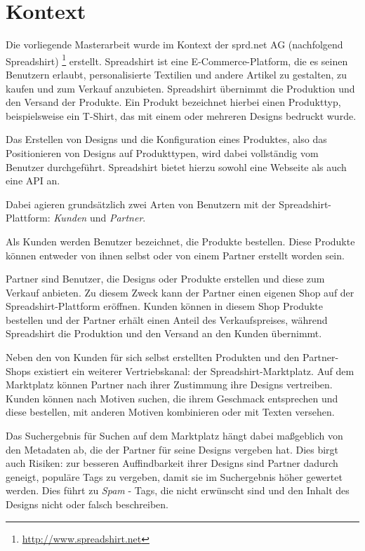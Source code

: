 \section{Kontext}

Die vorliegende Masterarbeit wurde im Kontext der sprd.net AG (nachfolgend Spreadshirt) \footnote{\url{http://www.spreadshirt.net}} erstellt. Spreadshirt ist eine E-Commerce-Platform, die es seinen Benutzern erlaubt, personalisierte Textilien und andere Artikel zu gestalten, zu kaufen und zum Verkauf anzubieten. Spreadshirt übernimmt die Produktion und den Versand der Produkte. Ein Produkt bezeichnet hierbei einen Produkttyp, beispielsweise ein T-Shirt, das mit einem oder mehreren Designs bedruckt wurde.

Das Erstellen von Designs und die Konfiguration eines Produktes, also das Positionieren von Designs auf Produkttypen, wird dabei vollständig vom Benutzer durchgeführt. Spreadshirt bietet hierzu sowohl eine Webseite als auch eine API an.

Dabei agieren grundsätzlich zwei Arten von Benutzern mit der Spreadshirt-Plattform: \emph{Kunden} und \emph{Partner}.

Als Kunden werden Benutzer bezeichnet, die Produkte bestellen. Diese Produkte können entweder von ihnen selbst oder von einem Partner erstellt worden sein. 

Partner sind Benutzer, die Designs oder Produkte erstellen und diese zum Verkauf anbieten. Zu diesem Zweck kann der Partner einen eigenen Shop auf der Spreadshirt-Plattform eröffnen. Kunden können in diesem Shop Produkte bestellen und der Partner erhält einen Anteil des Verkaufspreises, während Spreadshirt die Produktion und den Versand an den Kunden übernimmt.

Neben den von Kunden für sich selbst erstellten Produkten und den Partner-Shops existiert ein weiterer Vertriebskanal: der Spreadshirt-Marktplatz. Auf dem Marktplatz können Partner nach ihrer Zustimmung ihre Designs vertreiben. Kunden können nach Motiven suchen, die ihrem Geschmack entsprechen und diese bestellen, mit anderen Motiven kombinieren oder mit Texten versehen.

Das Suchergebnis für Suchen auf dem Marktplatz hängt dabei maßgeblich von den Metadaten ab, die der Partner für seine Designs vergeben hat. Dies birgt auch Risiken: zur besseren Auffindbarkeit ihrer Designs sind Partner dadurch geneigt, populäre Tags zu vergeben, damit sie im Suchergebnis höher gewertet werden. Dies führt zu \emph{Spam} - Tags, die nicht erwünscht sind und den Inhalt des Designs nicht oder falsch beschreiben.


